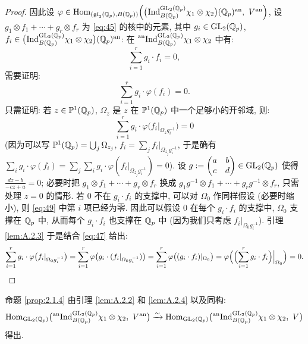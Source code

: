 \begin{proof}
因此设 $\varphi \in \Hom_{(\mathfrak{gl}_2(\Qp),B(\Qp))}\Bigl(\bigl(\pind{}_{B(\Qp)}^{\GL_2(\Qp)} \chi_1 \otimes \chi_2\bigr)(\Qp)^{\mathrm{an}},\ V^{\mathrm{an}}\Bigr)$, 设 $g_1 \otimes f_1 + \cdots + g_r \otimes f_r$ 为 \eqref{eq:45} 的核中的元素, 其中 $g_i \in \mathrm{GL}_2(\mathbb{Q}_p)$, $f_i \in \bigl(\prescript{}{}{\mathrm{Ind}}_{B(\mathbb{Q}_p)}^{\mathrm{GL}_2(\mathbb{Q}_p)} \chi_1 \otimes \chi_2\bigr)(\mathbb{Q}_p)^{\mathrm{an}}$:
在 $\prescript{\mathrm{an}}{}{\mathrm{Ind}}_{B(\mathbb{Q}_p)}^{\mathrm{GL}_2(\mathbb{Q}_p)} \chi_1 \otimes \chi_2$ 中有:
\begin{equation}
\label{eq:47}
\sum_{i=1}^{r} g_i \cdot f_i = 0,
\end{equation}
需要证明:
\begin{equation}
\label{eq:48}
\sum_{i=1}^{r} g_i \cdot \varphi(f_i) = 0.
\end{equation}
只需证明: 若 $z \in \mathbb{P}^{1}(\mathbb{Q}_p)$, $\Omega_z$ 是 $z$ 在 $\mathbb{P}^{1}(\mathbb{Q}_p)$ 中一个足够小的开邻域, 则:
\begin{equation}
\label{eq:49}
\sum_{i=1}^{r} g_i \cdot \varphi\bigl(f_i|_{\Omega_z g_i^{-1}}\bigr) = 0
\end{equation}
(因为可以写 $\mathbb{P}^{1}(\mathbb{Q}_p) = \bigcup_j \Omega_{z_j}$, $f_i = \sum_j f_i|_{\Omega_{z_j}g_i^{-1}}$, 于是确有 $\sum_i g_i \cdot \varphi(f_i) = \sum_j \sum_i g_i \cdot \varphi(f_i|_{\Omega_{z_j}g_i^{-1}}) = 0$).
设 $g := \begin{pmatrix} a & b \\ c & d \end{pmatrix} \in \mathrm{GL}_2(\mathbb{Q}_p)$ 使得 $\frac{dz-b}{-cz+a} = 0$; 必要时把 $g_1 \otimes f_1 + \cdots + g_r \otimes f_r$ 换成 $g_1g^{-1} \otimes f_1 + \cdots + g_rg^{-1} \otimes f_r$, 只需处理 $z = 0$ 的情形.
若 $0$ 不在 $g_i \cdot f_i$ 的支撑中, 可以对 $\Omega_0$ 作同样假设 (必要时缩小), 则 \eqref{eq:49} 中第 $i$ 项已经为零.
因此可以假设 $0$ 在每个 $g_i \cdot f_i$ 的支撑中, $\Omega_0$ 支撑在 $\mathbb{Q}_p$ 中, 从而每个 $g_i \cdot f_i$ 也支撑在 $\mathbb{Q}_p$ 中 (因为我们只考虑 $f_i|_{\Omega_0 g_i^{-1}}$).
引理 \ref{lem:A.2.3} 于是结合 \eqref{eq:47} 给出:
\[
\sum_{i=1}^{r} g_i \cdot \varphi\bigl(f_i|_{\Omega_0 g_i^{-1}}\bigr)
= \sum_{i=1}^{r} \varphi\bigl(g_i \cdot (f_i|_{\Omega_0 g_i^{-1}})\bigr)
= \sum_{i=1}^{r} \varphi\bigl((g_i \cdot f_i)|_{\Omega_0}\bigr)
= \varphi\Bigl(\Bigl(\sum_{i=1}^{r} g_i \cdot f_i\Bigr)\Big|_{\Omega_0}\Bigr) = 0.
\]
\end{proof}

命题 \ref{prop:2.1.4} 由引理 \ref{lem:A.2.2} 和 \ref{lem:A.2.4} 以及同构:
\[
\operatorname{Hom}_{\mathrm{GL}_2(\mathbb{Q}_p)}\bigl(\prescript{\mathrm{an}}{}{\mathrm{Ind}}_{B(\mathbb{Q}_p)}^{\mathrm{GL}_2(\mathbb{Q}_p)} \chi_1 \otimes \chi_2,\ V^{\mathrm{an}}\bigr)
\xrightarrow{\sim} \operatorname{Hom}_{\mathrm{GL}_2(\mathbb{Q}_p)}\bigl(\prescript{\mathrm{an}}{}{\mathrm{Ind}}_{B(\mathbb{Q}_p)}^{\mathrm{GL}_2(\mathbb{Q}_p)} \chi_1 \otimes \chi_2,\ V\bigr)
\]
得出.

